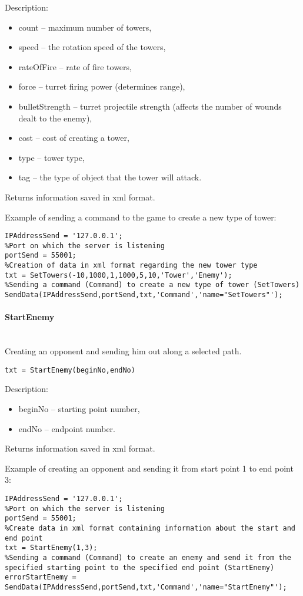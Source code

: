 Description:
\begin{itemize}
\item count -- maximum number of towers,
\item speed -- the rotation speed of the towers,
\item rateOfFire -- rate of fire towers,
\item force -- turret firing power (determines range),
\item bulletStrength -- turret projectile strength (affects the number of wounds dealt to the enemy),
\item cost -- cost of creating a tower,
\item type -- tower type,
\item tag -- the type of object that the tower will attack.
\end{itemize}

Returns information saved in xml format.

Example of sending a command to the game to create a new type of tower:
\begin{lstlisting}[style=Matlab-editor]
%Server address
IPAddressSend = '127.0.0.1';
%Port on which the server is listening
portSend = 55001;
%Creation of data in xml format regarding the new tower type
txt = SetTowers(-10,1000,1,1000,5,10,'Tower','Enemy');
%Sending a command (Command) to create a new type of tower (SetTowers)
SendData(IPAddressSend,portSend,txt,'Command','name="SetTowers"');
\end{lstlisting}

\paragraph{StartEnemy} \hspace{0pt} \\

Creating an opponent and sending him out along a selected path.
\begin{lstlisting}[style=Matlab-editor]
txt = StartEnemy(beginNo,endNo)
\end{lstlisting}

Description:
\begin{itemize}
\item beginNo -- starting point number,
\item endNo -- endpoint number.
\end{itemize}

Returns information saved in xml format.

Example of creating an opponent and sending it from start point 1 to end point 3:
\begin{lstlisting}[style=Matlab-editor]
%Server address
IPAddressSend = '127.0.0.1';
%Port on which the server is listening
portSend = 55001;
%Create data in xml format containing information about the start and end point
txt = StartEnemy(1,3);
%Sending a command (Command) to create an enemy and send it from the specified starting point to the specified end point (StartEnemy)
errorStartEnemy = SendData(IPAddressSend,portSend,txt,'Command','name="StartEnemy"');
\end{lstlisting}

